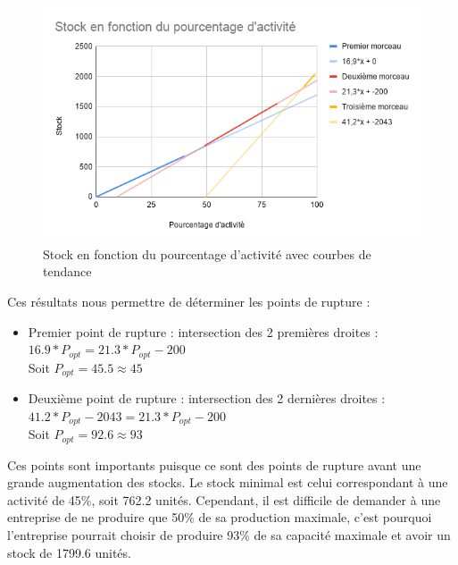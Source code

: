 \documentclass{article}
\begin{document}
\begin{center}
\begin{figure}[H]
\includegraphics[width=1\textwidth]{img/Stock_Activite_tendance}
\caption{Stock en fonction du pourcentage d'activité avec courbes de tendance}
\end{figure}
\end{center}

Ces résultats nous permettre de déterminer les points de rupture :
\begin{itemize}
\item Premier point de rupture : intersection des 2 premières droites :\\
$16.9*P_{opt} = 21.3*P_{opt} - 200$ \\
Soit $P_{opt} = 45.5 \approx 45 $
\item Deuxième point de rupture : intersection des 2 dernières droites :\\
$41.2*P_{opt}-2043 = 21.3*P_{opt} - 200$ \\
Soit $P_{opt} = 92.6 \approx 93 $
\end{itemize}

Ces points sont importants puisque ce sont des points de rupture avant une grande augmentation des stocks. Le stock minimal est celui correspondant à une activité de 45\%, soit 762.2 unités. Cependant, il est difficile de demander à une entreprise de ne produire que 50\% de sa production maximale, c'est pourquoi l'entreprise pourrait choisir de produire 93\% de sa capacité maximale et avoir un stock de 1799.6 unités. 
\end{document}
